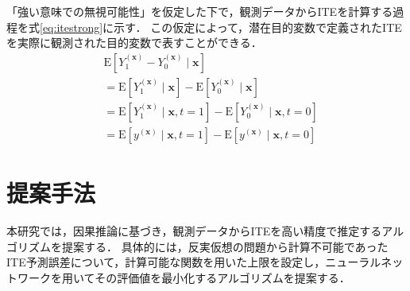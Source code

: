 \documentclass[dvipdfmx]{jreport}
\begin{document}
「強い意味での無視可能性」を仮定した下で，観測データからITEを計算する過程を式\eqref{eq:itestrong}に示す．
この仮定によって，潜在目的変数で定義されたITEを実際に観測された目的変数で表すことができる．
\begin{equation}
    \begin{aligned}
    &\mathrm{E}[Y_1^{(\boldsymbol{x})} - Y_0^{(\boldsymbol{x})} \mid \boldsymbol{x}] \\
    &= \mathrm{E}[Y_1^{(\boldsymbol{x})} \mid \boldsymbol{x}] - \mathrm{E}[Y_0^{(\boldsymbol{x})} \mid \boldsymbol{x}] \\
    &= \mathrm{E}[Y_1^{(\boldsymbol{x})} \mid \boldsymbol{x}, t = 1] - \mathrm{E}[Y_0^{(\boldsymbol{x})} \mid \boldsymbol{x}, t = 0] \\
    &= \mathrm{E}[y^{(\boldsymbol{x})} \mid \boldsymbol{x}, t = 1] - \mathrm{E}[y^{(\boldsymbol{x})} \mid \boldsymbol{x}, t = 0] \label{eq:itestrong}
    \end{aligned}
\end{equation}


\section{提案手法}
本研究では，因果推論に基づき，観測データからITEを高い精度で推定するアルゴリズムを提案する．
具体的には，反実仮想の問題から計算不可能であったITE予測誤差について，計算可能な関数を用いた上限を設定し，ニューラルネットワークを用いてその評価値を最小化するアルゴリズムを提案する．
\end{document}
